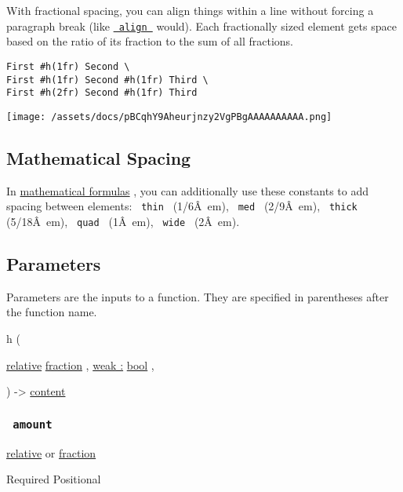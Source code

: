With fractional spacing, you can align things within a line without
forcing a paragraph break (like
\href{/docs/reference/layout/align/}{\texttt{\ align\ }} would). Each
fractionally sized element gets space based on the ratio of its fraction
to the sum of all fractions.

\begin{verbatim}
First #h(1fr) Second \
First #h(1fr) Second #h(1fr) Third \
First #h(2fr) Second #h(1fr) Third
\end{verbatim}

\texttt{[image: /assets/docs/pBCqhY9Aheurjnzy2VgPBgAAAAAAAAAA.png]}

\subsection{Mathematical Spacing}\label{math-spacing}

In \href{/docs/reference/math/}{mathematical formulas} , you can
additionally use these constants to add spacing between elements:
\texttt{\ thin\ } (1/6Â~em), \texttt{\ med\ } (2/9Â~em),
\texttt{\ thick\ } (5/18Â~em), \texttt{\ quad\ } (1Â~em),
\texttt{\ wide\ } (2Â~em).

\subsection{\texorpdfstring{{ Parameters
}}{ Parameters }}\label{parameters}

\label{parameters-tooltip}
Parameters are the inputs to a function. They are specified in
parentheses after the function name.

{ h } (

{ \href{/docs/reference/layout/relative/}{relative}
\href{/docs/reference/layout/fraction/}{fraction} , } {
\hyperref[parameters-weak]{weak :}
\href{/docs/reference/foundations/bool/}{bool} , }

) -\textgreater{} \href{/docs/reference/foundations/content/}{content}

\subsubsection{\texorpdfstring{\texttt{\ amount\ }}{ amount }}\label{parameters-amount}

\href{/docs/reference/layout/relative/}{relative} {or}
\href{/docs/reference/layout/fraction/}{fraction}

{Required} {{ Positional }}

